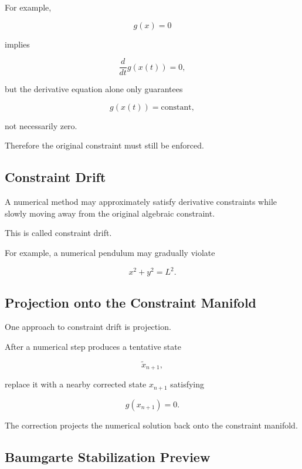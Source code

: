For example,

\[
g(x)=0
\]

implies

\[
\frac{d}{dt}g(x(t))=0,
\]

but the derivative equation alone only guarantees

\[
g(x(t))
=
\text{constant},
\]

not necessarily zero.

Therefore the original constraint must still be enforced.

\subsection{Constraint Drift}
\label{subsec:constraint-drift}

A numerical method may approximately satisfy derivative constraints while
slowly moving away from the original algebraic constraint.

This is called constraint drift.

For example, a numerical pendulum may gradually violate

\[
\boxed{
x^2+y^2=L^2.
}
\]

\subsection{Projection onto the Constraint Manifold}
\label{subsec:dae-projection}

One approach to constraint drift is projection.

After a numerical step produces a tentative state

\[
\widetilde{x}_{n+1},
\]

replace it with a nearby corrected state \(x_{n+1}\) satisfying

\[
\boxed{
g(x_{n+1})=0.
}
\]

The correction projects the numerical solution back onto the constraint
manifold.

\subsection{Baumgarte Stabilization Preview}
\label{subsec:baumgarte-stabilization-preview}

